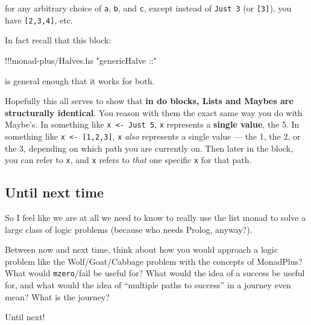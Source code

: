 \documentclass[]{article}
\newenvironment{Shaded}{}{}
\newcommand{\StringTok}[1]{\textcolor[rgb]{0.25,0.44,0.63}{{#1}}}
\newcommand{\FunctionTok}[1]{\textcolor[rgb]{0.02,0.16,0.49}{{#1}}}
\newcommand{\NormalTok}[1]{{#1}}
\begin{document}
for any arbitrary choice of \texttt{a}, \texttt{b}, and \texttt{c},
except instead of \texttt{Just\ 3} (or \texttt{{[}3{]}}), you have
\texttt{{[}2,3,4{]}}, etc.

In fact recall that this block:

\begin{Shaded}
\begin{Highlighting}[]
\FunctionTok{!!!}\NormalTok{monad}\FunctionTok{-}\NormalTok{plus}\FunctionTok{/}\NormalTok{Halves.hs }\StringTok{"genericHalve ::"}
\end{Highlighting}
\end{Shaded}

is general enough that it works for both.

Hopefully this all serves to show that \textbf{in do blocks, Lists and
Maybes are structurally identical}. You reason with them the exact same
way you do with Maybe's. In something like
\texttt{x\ \textless{}-\ Just\ 5}, \texttt{x} represents a
\textbf{single value}, the 5. In something like
\texttt{x\ \textless{}-\ {[}1,2,3{]}}, \texttt{x} \emph{also} represents
a single value --- the 1, the 2, or the 3, depending on which path you
are currently on. Then later in the block, you can refer to \texttt{x},
and \texttt{x} refers to \emph{that} one specific \texttt{x} for that
path.

\subsection{Until next time}\label{until-next-time}

So I feel like we are at all we need to know to really use the list
monad to solve a large class of logic problems (because who needs
Prolog, anyway?).

Between now and next time, think about how you would approach a logic
problem like the Wolf/Goat/Cabbage problem with the concepts of
MonadPlus? What would \texttt{mzero}/fail be useful for? What would the
idea of a success be useful for, and what would the idea of ``multiple
paths to success'' in a journey even mean? What is the journey?

Until next!
\end{document}
